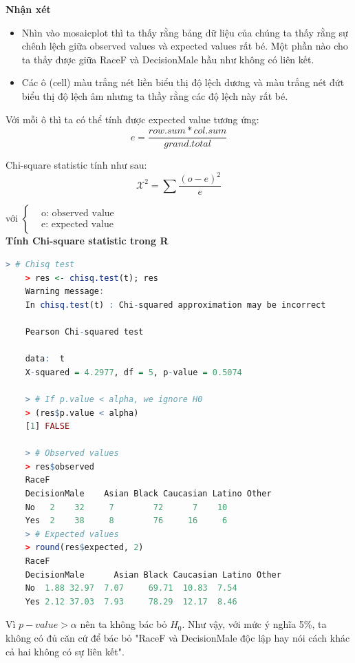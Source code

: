 \documentclass[a4paper,12pt]{article}
\begin{document}
	\textbf{Nhận xét}
	\begin{itemize}
		\item Nhìn vào mosaicplot thì ta thấy rằng bảng dữ liệu của chúng ta thấy rằng sự chênh lệch giữa observed values và expected values rất bé. Một phần nào cho ta thấy được giữa RaceF và DecisionMale hầu như không có liên kết.
		
		\item Các ô (cell) màu trắng nét liền biểu thị độ lệch dương và màu trắng nét đứt biểu thị độ lệch âm nhưng ta thầy rằng các độ lệch này rất bé.
	\end{itemize}
	
	Với mỗi ô thì ta có thể tính được expected value tương ứng:
	$$e = \frac{row.sum \ast col.sum}{grand.total}$$
	
	Chi-square statistic tính như sau:
	$$\mathcal{X}^2 = \sum \frac{{(o - e)}^2}{e}$$
	
	với $\begin{cases}
		& \text{o: observed value}\\
		& \text{e: expected value}
	\end{cases}$\\
	
	\textbf{Tính Chi-square statistic trong R}
	
	\begin{lstlisting}[language = R]
	> # Chisq test
	> res <- chisq.test(t); res
	Warning message:
	In chisq.test(t) : Chi-squared approximation may be incorrect
	
	Pearson Chi-squared test
	
	data:  t
	X-squared = 4.2977, df = 5, p-value = 0.5074
	
	> # If p.value < alpha, we ignore H0
	> (res$p.value < alpha)
	[1] FALSE
	
	> # Observed values
	> res$observed
	RaceF
	DecisionMale    Asian Black Caucasian Latino Other
	No   2    32     7        72      7    10
	Yes  2    38     8        76     16     6
	> # Expected values
	> round(res$expected, 2)
	RaceF
	DecisionMale      Asian Black Caucasian Latino Other
	No  1.88 32.97  7.07     69.71  10.83  7.54
	Yes 2.12 37.03  7.93     78.29  12.17  8.46
	\end{lstlisting}
	
	Vì $p-value > \alpha$ nên ta không bác bỏ $H_0$. Như vậy, với mức ý nghĩa 5\%, ta không có đủ căn cứ để bác bỏ "RaceF và DecisionMale độc lập hay nói cách khác cả hai không có sự liên kết".\\
		
\end{document}
